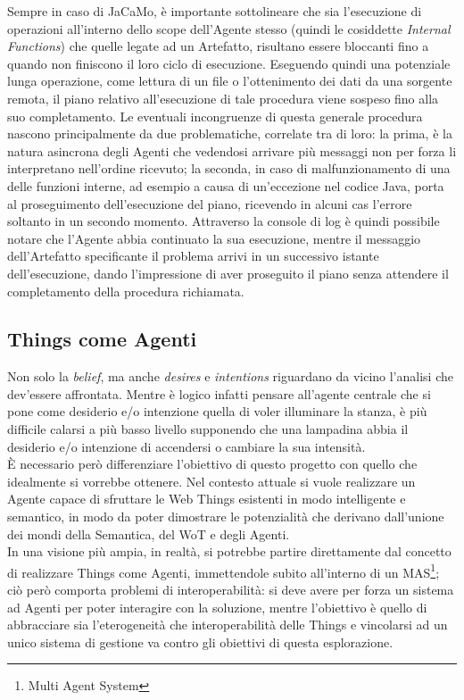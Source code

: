 \documentclass[12pt,a4paper,openright,oneside]{report}
\begin{document}
Sempre in caso di JaCaMo, è importante sottolineare che sia l'esecuzione di operazioni all'interno dello scope dell'Agente stesso (quindi le cosiddette \textit{Internal Functions}) che quelle legate ad un Artefatto, risultano essere bloccanti fino a quando non finiscono il loro ciclo di esecuzione. Eseguendo quindi una potenziale lunga operazione, come lettura di un file o l'ottenimento dei dati da una sorgente remota, il piano relativo all'esecuzione di tale procedura viene sospeso fino alla suo completamento. Le eventuali incongruenze di questa generale procedura nascono principalmente da due problematiche, correlate tra di loro: la prima, è la natura asincrona degli Agenti che vedendosi arrivare più messaggi non per forza li interpretano nell'ordine ricevuto; la seconda, in caso di malfunzionamento di una delle funzioni interne, ad esempio a causa di un'eccezione nel codice Java, porta al proseguimento dell'esecuzione del piano, ricevendo in alcuni cas l'errore soltanto in un secondo momento. Attraverso la console di log è quindi possibile notare che l'Agente abbia continuato la sua esecuzione, mentre il messaggio dell'Artefatto specificante il problema arrivi in un successivo istante dell'esecuzione, dando l'impressione di aver proseguito il piano senza attendere il completamento della procedura richiamata.\\

\subsection{Things come Agenti}
\label{sec:agentthings}
Non solo la \textit{belief}, ma anche \textit{desires} e \textit{intentions} riguardano da vicino l'analisi che dev'essere affrontata. Mentre è logico infatti pensare all'agente centrale che si pone come desiderio e/o intenzione quella di voler illuminare la stanza, è più difficile calarsi a più basso livello supponendo che una lampadina abbia il desiderio e/o intenzione di accendersi o cambiare la sua intensità.\\

È necessario però differenziare l'obiettivo di questo progetto con quello che idealmente si vorrebbe ottenere. Nel contesto attuale si vuole realizzare un Agente capace di sfruttare le Web Things esistenti in modo intelligente e semantico, in modo da poter dimostrare le potenzialità che derivano dall'unione dei mondi della Semantica, del WoT e degli Agenti.\\

In una visione più ampia, in realtà, si potrebbe partire direttamente dal concetto di realizzare Things come Agenti, immettendole subito all'interno di un MAS\footnote{Multi Agent System}; ciò però comporta problemi di interoperabilità: si deve avere per forza un sistema ad Agenti per poter interagire con la soluzione, mentre l'obiettivo è quello di abbracciare sia l'eterogeneità che interoperabilità delle Things e vincolarsi ad un unico sistema di gestione va contro gli obiettivi di questa esplorazione.
\end{document}
